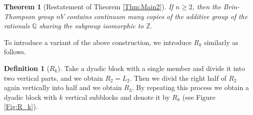 \documentclass[12pt,reqno]{amsart}
\theoremstyle{plain}
\newtheorem{theorem}{Theorem}[section]
\theoremstyle{definition}
\newtheorem{definition}{Definition}[section]
\theoremstyle{remark}
\numberwithin{equation}{section}
\begin{document}
%
\begin{theorem}[Restatement of Theorem \ref{Thm:Main2}]\label{Thm:EmbeddingQ} 
	If  $n \geq 2$,  
	then the Brin-Thompson group  $nV$  contains continuum many copies of
	the additive group of the rationals  $\mathbb{Q}$  sharing 
	the subgroup isomorphic to  $\mathbb{Z}$.  
\end{theorem}  

To introduce a variant of the above construction,   
	we introduce $R_k$ similarly as follows.
	\begin{definition}[$R_k$] 
	        Take a dyadic block with a single member 
		and divide it into two vertical parts, 
		and we obtain  $R_2 = L_2$.
		Then we divid the right half of  $R_2$  again vertically into half and we obtain  $R_3$.
		By repeating this process we obtain a dyadic block with $k$ vertical subblocks 
		and denote it by  $R_k$ (see Figure \ref{Fig:R_k}).
	\end{definition}
\end{document}
